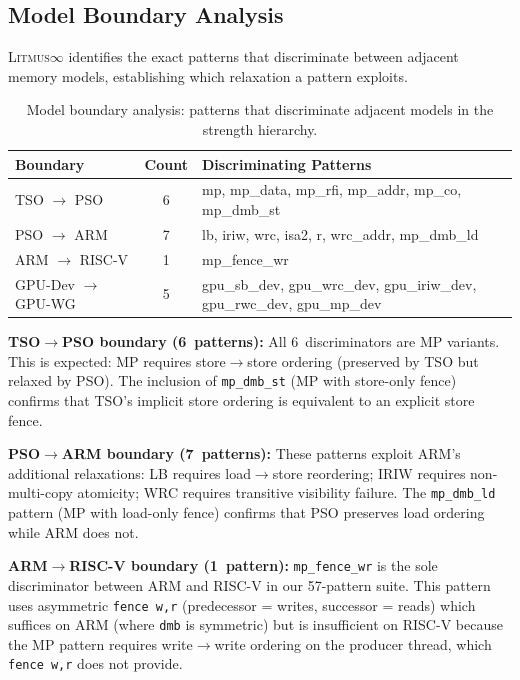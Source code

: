 \documentclass[10pt]{article}
\newcommand{\litmus}{\textsc{Litmus$\infty$}}
\begin{document}
\subsection{Model Boundary Analysis}
\label{sec:boundaries}

\litmus{} identifies the exact patterns that discriminate between
adjacent memory models, establishing which relaxation a pattern
exploits.

\begin{table}[h]
\centering
\caption{Model boundary analysis: patterns that discriminate adjacent
models in the strength hierarchy.}
\label{tab:boundaries}
\small
\begin{tabular}{lcp{8cm}}
\toprule
\textbf{Boundary} & \textbf{Count} & \textbf{Discriminating Patterns} \\
\midrule
TSO $\to$ PSO & 6 & mp, mp\_data, mp\_rfi, mp\_addr, mp\_co, mp\_dmb\_st \\
PSO $\to$ ARM & 7 & lb, iriw, wrc, isa2, r, wrc\_addr, mp\_dmb\_ld \\
ARM $\to$ RISC-V & 1 & mp\_fence\_wr \\
\midrule
GPU-Dev $\to$ GPU-WG & 5 & gpu\_sb\_dev, gpu\_wrc\_dev, gpu\_iriw\_dev, gpu\_rwc\_dev, gpu\_mp\_dev \\
\bottomrule
\end{tabular}
\end{table}

\textbf{TSO$\to$PSO boundary (6~patterns):} All 6~discriminators are
MP variants. This is expected: MP requires store$\to$store ordering
(preserved by TSO but relaxed by PSO). The inclusion of
\texttt{mp\_dmb\_st} (MP with store-only fence) confirms that
TSO's implicit store ordering is equivalent to an explicit store fence.

\textbf{PSO$\to$ARM boundary (7~patterns):} These patterns exploit
ARM's additional relaxations: LB requires load$\to$store reordering;
IRIW requires non-multi-copy atomicity; WRC requires transitive
visibility failure. The \texttt{mp\_dmb\_ld} pattern (MP with
load-only fence) confirms that PSO preserves load ordering while
ARM does not.

\textbf{ARM$\to$RISC-V boundary (1~pattern):} \texttt{mp\_fence\_wr}
is the sole discriminator between ARM and RISC-V in our 57-pattern
suite. This pattern uses asymmetric \texttt{fence~w,r} (predecessor
= writes, successor = reads) which suffices on ARM (where \texttt{dmb}
is symmetric) but is insufficient on RISC-V because the MP pattern
requires write$\to$write ordering on the producer thread, which
\texttt{fence~w,r} does not provide.
\end{document}

